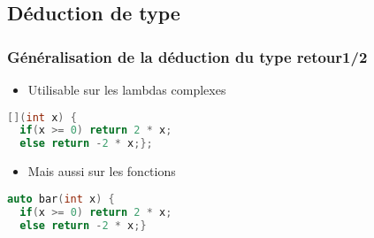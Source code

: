 \documentclass[C++.tex]{subfiles}
\begin{document}
\subsection*{Déduction de type}
\begin{frame}[fragile]
	\frametitle{Généralisation de la déduction du type retour\titlehfill{}1/2}
	\begin{itemize}
		\item Utilisable sur les lambdas complexes
	\end{itemize}

	\begin{lstlisting}[language=C++]
[](int x) { 
  if(x >= 0) return 2 * x; 
  else return -2 * x;};\end{lstlisting}

	\pause

	\begin{itemize}
		\item Mais aussi sur les fonctions
	\end{itemize}

	\begin{lstlisting}[language=C++]
auto bar(int x) {
  if(x >= 0) return 2 * x; 
  else return -2 * x;}\end{lstlisting}
\end{frame}
\end{document}
